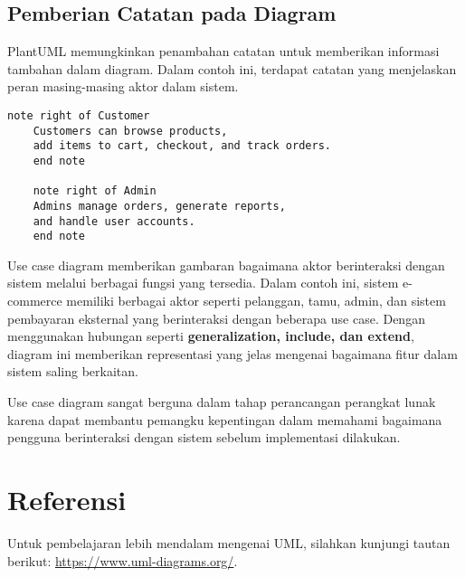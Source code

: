 \subsection{Pemberian Catatan pada Diagram}
PlantUML memungkinkan penambahan catatan untuk memberikan informasi tambahan dalam diagram. Dalam contoh ini, terdapat catatan yang menjelaskan peran masing-masing aktor dalam sistem.

\begin{lstlisting}[language=puml]
	note right of Customer
	Customers can browse products,
	add items to cart, checkout, and track orders.
	end note
	
	note right of Admin
	Admins manage orders, generate reports, 
	and handle user accounts.
	end note
\end{lstlisting}

Use case diagram memberikan gambaran bagaimana aktor berinteraksi dengan sistem melalui berbagai fungsi yang tersedia. Dalam contoh ini, sistem e-commerce memiliki berbagai aktor seperti pelanggan, tamu, admin, dan sistem pembayaran eksternal yang berinteraksi dengan beberapa use case. Dengan menggunakan hubungan seperti \textbf{generalization, include, dan extend}, diagram ini memberikan representasi yang jelas mengenai bagaimana fitur dalam sistem saling berkaitan.

Use case diagram sangat berguna dalam tahap perancangan perangkat lunak karena dapat membantu pemangku kepentingan dalam memahami bagaimana pengguna berinteraksi dengan sistem sebelum implementasi dilakukan.

\section{Referensi}
Untuk pembelajaran lebih mendalam mengenai UML, silahkan kunjungi tautan berikut: \url{https://www.uml-diagrams.org/}.
